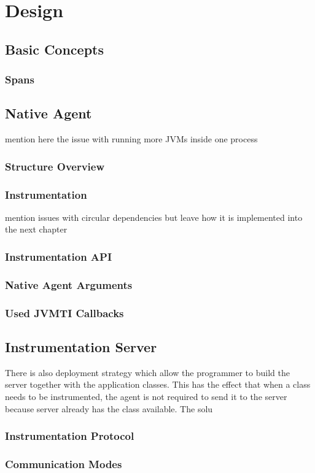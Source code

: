 \chapter{Design}
\label{chap:design}
\section{Basic Concepts}
\subsection{Spans}
\label{subsec:spans}
\section{Native Agent}
mention here the issue with running more JVMs inside one process
\subsection{Structure Overview}
\subsection{Instrumentation}
mention issues with circular dependencies but leave how it is implemented into the next chapter
\subsection{Instrumentation API}
\subsection{Native Agent Arguments}
\subsection{Used JVMTI Callbacks}
\section{Instrumentation Server}
 There is also deployment strategy which allow the programmer to build the server together with the application classes. This has the effect that when a class needs to be instrumented, the agent is not required to send it to the server because server already has the class available. The solu
\subsection{Instrumentation Protocol}
\subsection{Communication Modes}
